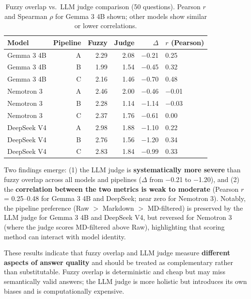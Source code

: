 \documentclass{article}
\begin{document}
\begin{table}[t]
    \centering
    \caption{Fuzzy overlap vs.\ LLM judge comparison (50 questions). Pearson $r$ and Spearman $\rho$ for Gemma 3 4B shown; other models show similar or lower correlations.}
    \label{tab:judge}
    \begin{tabular}{lrrrrl}
        \toprule
        Model & Pipeline & Fuzzy & Judge & $\Delta$ & $r$ (Pearson) \\
        \midrule
        Gemma 3 4B & A & 2.29 & 2.08 & $-$0.21 & 0.25 \\
        Gemma 3 4B & B & 1.99 & 1.54 & $-$0.45 & 0.32 \\
        Gemma 3 4B & C & 2.16 & 1.46 & $-$0.70 & 0.48 \\
        \midrule
        Nemotron 3  & A & 2.46 & 2.00 & $-$0.46 & $-$0.01 \\
        Nemotron 3  & B & 2.28 & 1.14 & $-$1.14 & $-$0.03 \\
        Nemotron 3  & C & 2.37 & 1.76 & $-$0.61 & 0.00 \\
        \midrule
        DeepSeek V4 & A & 2.98 & 1.88 & $-$1.10 & 0.22 \\
        DeepSeek V4 & B & 2.76 & 1.56 & $-$1.20 & 0.34 \\
        DeepSeek V4 & C & 2.83 & 1.84 & $-$0.99 & 0.33 \\
        \bottomrule
    \end{tabular}
\end{table}

Two findings emerge: (1) the LLM judge is \textbf{systematically more severe} than fuzzy overlap across all models and pipelines ($\Delta$ from $-$0.21 to $-$1.20), and (2) the \textbf{correlation between the two metrics is weak to moderate} (Pearson $r$ = 0.25--0.48 for Gemma 3 4B and DeepSeek; near zero for Nemotron 3). Notably, the pipeline preference (Raw $>$ Markdown $>$ MD-filtered) is preserved by the LLM judge for Gemma 3 4B and DeepSeek V4, but reversed for Nemotron 3 (where the judge scores MD-filtered above Raw), highlighting that scoring method can interact with model identity.

These results indicate that fuzzy overlap and LLM judge measure \textbf{different aspects of answer quality} and should be treated as complementary rather than substitutable. Fuzzy overlap is deterministic and cheap but may miss semantically valid answers; the LLM judge is more holistic but introduces its own biases and is computationally expensive.
\end{document}
